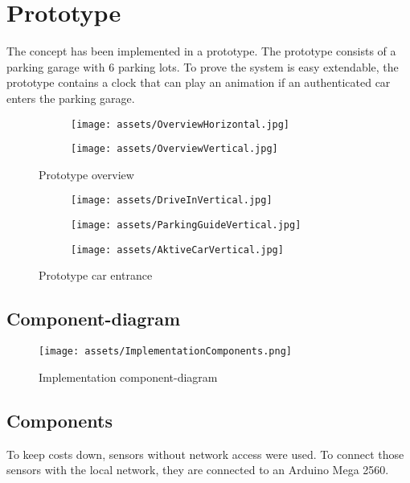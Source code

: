 \chapter{Prototype}
The concept has been implemented in a prototype. The prototype consists of a parking garage with 6 parking lots. To prove the system is easy extendable, the prototype contains a clock that can play an animation if an authenticated car enters the parking garage. 

\begin{figure}[H]
    \centering
    \begin{subfigure}{0.6265\textwidth}
        \texttt{[image: assets/OverviewHorizontal.jpg]}     
    \end{subfigure}
    \begin{subfigure}{0.3525\textwidth}
        \texttt{[image: assets/OverviewVertical.jpg]}   
    \end{subfigure}
    \caption{Prototype overview}
    \label{fig:Overview}
\end{figure}

\begin{figure}[H]
    \centering
    \begin{subfigure}{0.325\textwidth}
         \texttt{[image: assets/DriveInVertical.jpg]}     
    \end{subfigure}
    \begin{subfigure}{0.325\textwidth}
        \texttt{[image: assets/ParkingGuideVertical.jpg]}  
    \end{subfigure}
     \begin{subfigure}{0.325\textwidth}
        \texttt{[image: assets/AktiveCarVertical.jpg]}   
    \end{subfigure}
    \caption{Prototype car entrance}
    \label{fig:Entrance of car}
\end{figure}

\section{Component-diagram}
\begin{figure}[H]
    \centering
    \texttt{[image: assets/ImplementationComponents.png]}
    \caption{Implementation component-diagram}
    \label{fig:Implementation component-diagram}
\end{figure}

\section{Components}
To keep costs down, sensors without network access were used. To connect those sensors with the local network, they are connected to an Arduino Mega 2560. 


